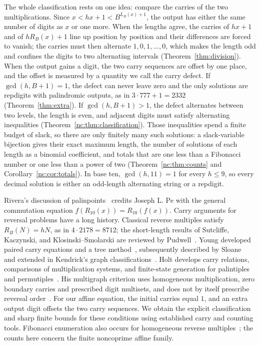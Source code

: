 \documentclass[11pt]{amsart}
\theoremstyle{remark}\newtheorem{remark}[theorem]{Remark}
\begin{document}
The whole classification rests on one idea: compare the carries of the two multiplications. Since $x<hx+1<B^{L_B(x)+1}$, the output has either the same number of digits as $x$ or one more. When the lengths agree, the carries of $hx+1$ and of $hR_B(x)+1$ line up position by position and their differences are forced to vanish; the carries must then alternate $1,0,1,\ldots,0$, which makes the length odd and confines the digits to two alternating intervals (Theorem~\ref{thm:division}). When the output gains a digit, the two carry sequences are offset by one place, and the offset is measured by a quantity we call the carry defect. If $\gcd(h,B+1)=1$, the defect can never leave zero and the only solutions are repdigits with palindromic outputs, as in $3\cdot777+1=2332$ (Theorem~\ref{thm:extra}). If $\gcd(h,B+1)>1$, the defect alternates between two levels, the length is even, and adjacent digits must satisfy alternating inequalities (Theorem~\ref{nc:thm:classification}). Those inequalities spend a finite budget of slack, so there are only finitely many such solutions: a slack-variable bijection gives their exact maximum length, the number of solutions of each length as a binomial coefficient, and totals that are one less than a Fibonacci number or one less than a power of two (Theorem~\ref{nc:thm:counts} and Corollary~\ref{nc:cor:totals}). In base ten, $\gcd(h,11)=1$ for every $h\le9$, so every decimal solution is either an odd-length alternating string or a repdigit.

Rivera's discussion of palinpoints~\cite{Palinpoints} credits Joseph L. Pe with the general commutation equation $f(R_{10}(x))=R_{10}(f(x))$. Carry arguments for reversal problems have a long history. Classical reverse multiples satisfy $R_B(N)=hN$, as in $4\cdot2178=8712$; the short-length results of Sutcliffe, Kaczynski, and Klosinski--Smolarski are reviewed by Pudwell~\cite{Pudwell2007}. Young developed paired carry equations and a tree method~\cite{Young1992Multiples,Young1992Trees}, subsequently described by Sloane~\cite[Section 2]{Sloane2014} and extended in Kendrick's graph classifications~\cite{Kendrick2015}. Holt develops carry relations, comparisons of multiplication systems, and finite-state generation for palintiples and permutiples~\cite{Holt2014,Holt2017,Holt2024,Holt2025Finding,Holt2025Multigraph}. His multigraph criterion uses homogeneous multiplication, zero boundary carries and prescribed digit multisets, and does not by itself prescribe reversal order~\cite[Section 4, Theorem 7 and Corollary 2]{Holt2025Multigraph}. For our affine equation, the initial carries equal $1$, and an extra output digit offsets the two carry sequences. We obtain the explicit classification and sharp finite bounds for these conditions using established carry and counting tools. Fibonacci enumeration also occurs for homogeneous reverse multiples~\cite[Section 3.1]{Sloane2014}; the counts here concern the finite noncoprime affine family.
\end{document}
